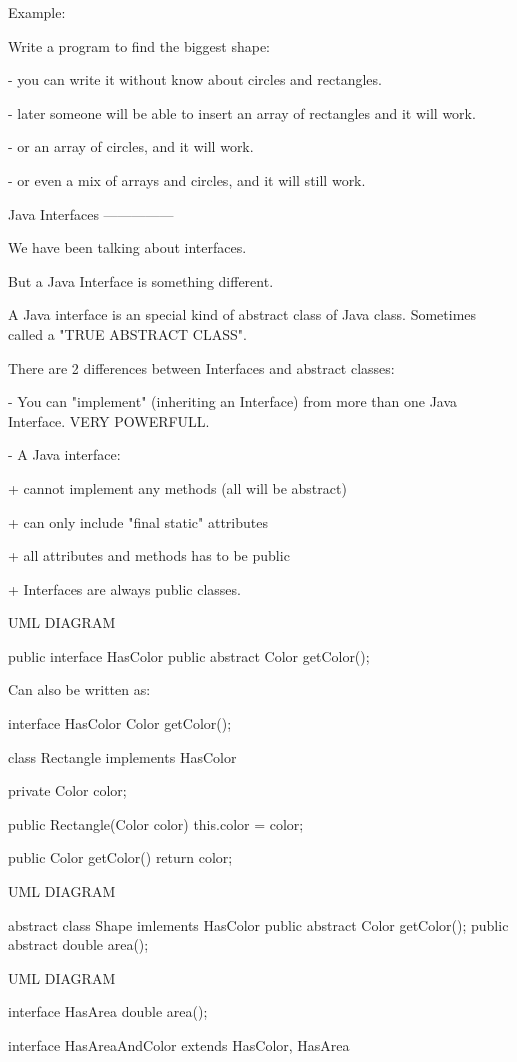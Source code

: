 \documentclass[a4paper, 9pt]{extarticle}
\begin{document}
\begin{blackboard}
Example:

Write a program to find the biggest shape:

- you can write it without know about circles and rectangles.

- later someone will be able to insert an array of rectangles and it will
  work.

- or an array of circles, and it will work.

- or even a mix of arrays and circles, and it will still work.


Java Interfaces
---------------

We have been talking about interfaces.

But a Java Interface is something different.

A Java interface is an special kind of abstract class of Java class. Sometimes
called a "TRUE ABSTRACT CLASS".

There are 2 differences between Interfaces and abstract classes:

- You can "implement" (inheriting an Interface) from more than one Java
  Interface. VERY POWERFULL.

- A Java interface:

  + cannot implement any methods (all will be abstract)

  + can only include "final static" attributes

  + all attributes and methods has to be public

  + Interfaces are always public classes.

UML DIAGRAM

public interface HasColor {
    public abstract Color getColor();
}

Can also be written as:

interface HasColor {
    Color getColor();
}

class Rectangle implements HasColor {
    private Color color;

    public Rectangle(Color color) {
        this.color = color;
    }

    public Color getColor() {
        return color;
    }
}

UML DIAGRAM

abstract class Shape imlements HasColor {
    public abstract Color getColor();
    public abstract double area();
}

UML DIAGRAM

interface HasArea {
    double area();
}

interface HasAreaAndColor extends HasColor, HasArea {
}


\end{blackboard}
\end{document}
